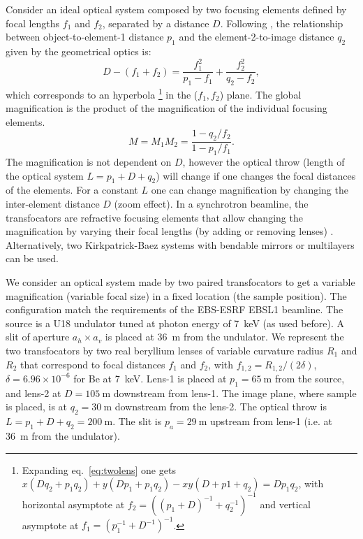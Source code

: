 \documentclass[9pt,twocolumn,twoside]{osajnl}
\begin{document}
Consider an ideal optical system composed by two focusing elements defined by focal lengths $f_1$ and $f_2$, separated by a distance $D$. Following \cite{Goodman85}, the relationship between object-to-element-1 distance $p_1$ and the element-2-to-image distance $q_2$ given by the geometrical optics is:
\begin{equation}
\label{eq:twolens}
    D-(f_1+f_2)=\frac{f_1^2}{p_1-f_1} + \frac{f_2^2}{q_2-f_2},
\end{equation}
which corresponds to an hyperbola
\footnote{Expanding eq.~\ref{eq:twolens} one gets $x(D q_2 + p_1 q_2) + y (D p_1 + p_1 q_2) - x y (D + p1 + q_2) = D p_1 q_2$,  with horizontal asymptote at $f_{2}=((p_1+D)^{-1}+q_2^{-1})^{-1}$ and vertical asymptote at $f_{1}=(p_1^{-1}+D^{-1})^{-1}$.} in the ($f_1,f_2$) plane.
The global magnification is the product of the magnification of the individual focusing elements.
\begin{equation}
\label{eq:magnification}
    M=M_1 M_2=\frac{1-q_2/f_2}{1-p_1/f_1}.
\end{equation}
The magnification is not dependent on $D$, however the optical throw (length of the optical system $L=p_1+D+q_2$) will change if one changes the focal distances of the elements. For a constant $L$ one can change magnification by changing the inter-element distance $D$ (zoom effect). In a synchrotron beamline, the transfocators are refractive focusing elements that allow changing the magnification by varying their focal lengths (by adding or removing lenses) \cite{Vaughan:kv5084}. Alternatively, two Kirkpatrick-Baez systems with bendable mirrors or multilayers can be used. 



We consider an optical system made by two paired transfocators to get a variable magnification (variable focal size) in a fixed location (the sample position). The configuration match the requirements of the EBS-ESRF EBSL1 beamline. 
The source is a U18 undulator tuned at photon energy of \SI{7}{keV} (as used before). A slit of aperture $a_h \times a_v$ is placed at \SI{36}{\meter} from the undulator.  
We represent the two transfocators by two real beryllium lenses of variable curvature radius $R_1$ and $R_2$ that correspond to focal distances $f_1$ and $f_2$, with $f_{1,2}=R_{1,2}/(2 \delta)$, $\delta=6.96\times10^{-6}$ for Be at \SI{7}{keV}. Lens-1 is placed at $p_1=\SI{65}{\meter}$ from the source, and lens-2 at $D=\SI{105}{\meter}$ downstream from lens-1. The image plane, where sample is placed, is at $q_2=\SI{30}{\meter}$ downstream from the lens-2. The optical throw is $L=p_1+D+q_2=\SI{200}{\meter}$. The slit is $p_a=\SI{29}{\meter}$ upstream from lens-1 (i.e. at \SI{36}{\meter} from the undulator). 
\end{document}
